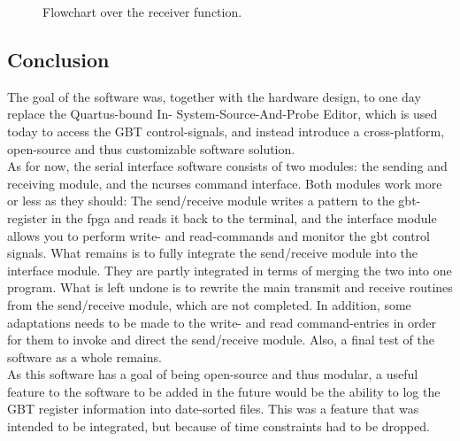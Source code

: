 \documentclass[main.tex]{subfiles}
\begin{document}
\begin{figure}[H] %
\begin{center}
\resizebox{0.7\linewidth}{!}{}
\caption{Flowchart over the receiver function.}
\label{fig:flowrx}
\end{center}
\end{figure}


\subsection{Conclusion}

The goal of the software was, together with the hardware design, to one day replace the Quartus-bound In-
System-Source-And-Probe Editor, which is used today to access the GBT control-signals, and instead introduce a cross-platform, open-source and thus customizable software solution.\\

As for now, the serial interface software consists of two modules: the sending and receiving module, and the ncurses command interface. Both modules work more or less as they should: The send/receive module writes a pattern to the \gls{gbt}-register in the \gls{fpga} and reads it back to the terminal, and the interface module allows you to perform write- and read-commands and monitor the \gls{gbt} control signals. What remains is to fully integrate the send/receive module into the interface module. They are partly integrated in terms of merging the two into one program. What is left undone is to rewrite the main transmit and receive routines from the send/receive module, which are not completed. In addition, some adaptations needs to be made to the write- and read command-entries in order for them to invoke and direct the send/receive module. Also, a final test of the software as a whole remains.\\

As this software has   a goal of being open-source and thus modular, a useful feature to the software to be added in the future would be the ability to log the GBT register information into date-sorted files. This was a feature that was intended to be integrated, but because of time constraints had to be dropped.
\end{document}
